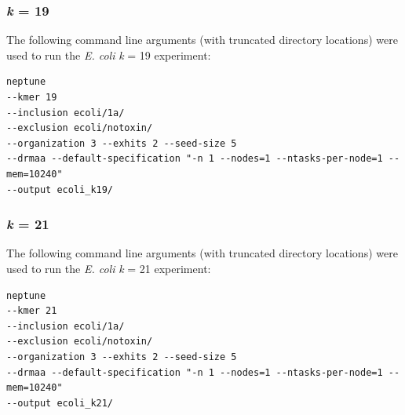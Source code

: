 \documentclass[a4paper,10pt]{article}
\begin{document}
\subsubsection*{\textit{k} = 19}

The following command line arguments (with truncated directory locations) were used to run the \textit{E. coli} \textit{k} = 19 experiment:

\begin{verbatim}
neptune
--kmer 19
--inclusion ecoli/1a/
--exclusion ecoli/notoxin/
--organization 3 --exhits 2 --seed-size 5
--drmaa --default-specification "-n 1 --nodes=1 --ntasks-per-node=1 --mem=10240"
--output ecoli_k19/
\end{verbatim}

\subsubsection*{\textit{k} = 21}

The following command line arguments (with truncated directory locations) were used to run the \textit{E. coli} \textit{k} = 21 experiment:

\begin{verbatim}
neptune
--kmer 21
--inclusion ecoli/1a/
--exclusion ecoli/notoxin/
--organization 3 --exhits 2 --seed-size 5
--drmaa --default-specification "-n 1 --nodes=1 --ntasks-per-node=1 --mem=10240"
--output ecoli_k21/
\end{verbatim}
\end{document}
